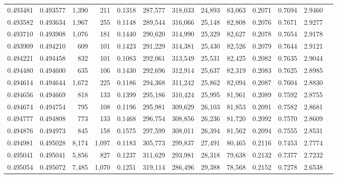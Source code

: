 \begin{tabular}{rrrrrrrrrrrrr}
0.493481 & 0.493577 & 1,390 &   211 &                                     0.1318 & 287,577 & 318,033 &  24,893 &  83,063 & 0.2071 & 0.7694 & 2.9460 \\
0.493582 & 0.493634 & 1,967 &   255 &                                     0.1148 & 289,544 & 316,066 &  25,148 &  82,808 & 0.2076 & 0.7671 & 2.9277 \\
0.493710 & 0.493908 & 1,076 &   181 &                                     0.1440 & 290,620 & 314,990 &  25,329 &  82,627 & 0.2078 & 0.7654 & 2.9178 \\
0.493909 & 0.494210 &   609 &   101 &                                     0.1423 & 291,229 & 314,381 &  25,430 &  82,526 & 0.2079 & 0.7644 & 2.9121 \\
0.494221 & 0.494458 &   832 &   101 &                                     0.1083 & 292,061 & 313,549 &  25,531 &  82,425 & 0.2082 & 0.7635 & 2.9044 \\
0.494480 & 0.494600 &   635 &   106 &                                     0.1430 & 292,696 & 312,914 &  25,637 &  82,319 & 0.2083 & 0.7625 & 2.8985 \\
0.494614 & 0.494644 & 1,672 &   225 &                                     0.1186 & 294,368 & 311,242 &  25,862 &  82,094 & 0.2087 & 0.7604 & 2.8830 \\
0.494656 & 0.494669 &   818 &   133 &                                     0.1399 & 295,186 & 310,424 &  25,995 &  81,961 & 0.2089 & 0.7592 & 2.8755 \\
0.494674 & 0.494754 &   795 &   108 &                                     0.1196 & 295,981 & 309,629 &  26,103 &  81,853 & 0.2091 & 0.7582 & 2.8681 \\
0.494777 & 0.494808 &   773 &   133 &                                     0.1468 & 296,754 & 308,856 &  26,236 &  81,720 & 0.2092 & 0.7570 & 2.8609 \\
0.494876 & 0.494973 &   845 &   158 &                                     0.1575 & 297,599 & 308,011 &  26,394 &  81,562 & 0.2094 & 0.7555 & 2.8531 \\
0.494981 & 0.495028 & 8,174 & 1,097 &                                     0.1183 & 305,773 & 299,837 &  27,491 &  80,465 & 0.2116 & 0.7453 & 2.7774 \\
0.495041 & 0.495041 & 5,856 &   827 &                                     0.1237 & 311,629 & 293,981 &  28,318 &  79,638 & 0.2132 & 0.7377 & 2.7232 \\
0.495054 & 0.495072 & 7,485 & 1,070 &                                     0.1251 & 319,114 & 286,496 &  29,388 &  78,568 & 0.2152 & 0.7278 & 2.6538 \\

\end{tabular}
